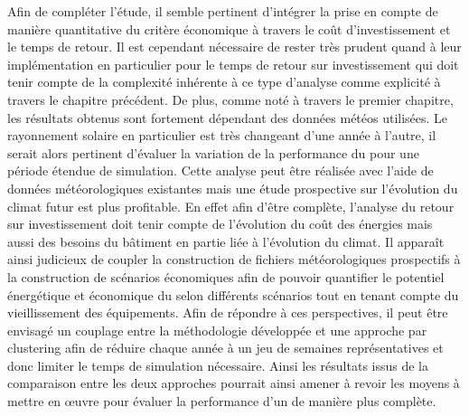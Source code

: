 Afin de compléter l’étude, il semble pertinent d’intégrer la prise en compte de manière
quantitative du critère économique à travers le coût d’investissement et le temps de
retour. Il est cependant nécessaire de rester très prudent quand à leur implémentation en
particulier pour le temps de retour sur investissement qui doit tenir compte de la
complexité inhérente à ce type d’analyse comme explicité à travers le chapitre précédent.
De plus, comme noté à travers le premier chapitre, les résultats obtenus sont fortement
dépendant des données météos utilisées. Le rayonnement solaire en particulier est très
changeant d’une année à l’autre, il serait alors pertinent d’évaluer la variation de la
performance du  pour une période étendue de simulation. Cette analyse peut être
réalisée avec l’aide de données météorologiques existantes mais une étude prospective sur
l’évolution du climat futur est plus profitable. En effet afin d’être complète, l’analyse
du retour sur investissement doit tenir compte de l’évolution du coût des énergies mais
aussi des besoins du bâtiment en partie liée à l’évolution du climat. Il apparaît ainsi
judicieux de coupler la construction de fichiers météorologiques prospectifs à la
construction de scénarios économiques afin de pouvoir quantifier le potentiel énergétique
et économique du  selon différents scénarios tout en tenant compte du
vieillissement des équipements. Afin de répondre à ces perspectives, il peut être envisagé
un couplage entre la méthodologie développée et une approche par clustering afin de
réduire chaque année à un jeu de semaines représentatives et donc limiter le temps de
simulation nécessaire. Ainsi les résultats issus de la comparaison entre les deux
approches pourrait ainsi amener à revoir les moyens à mettre en œuvre pour évaluer la
performance d’un  de manière plus complète.

